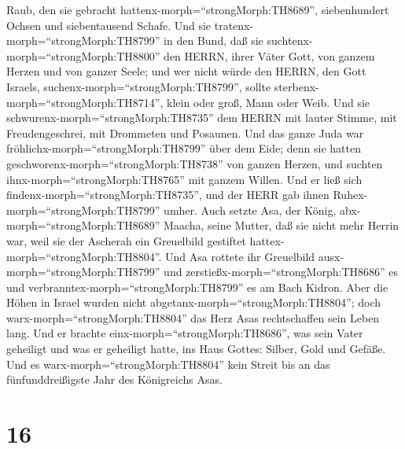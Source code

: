 Raub, den sie gebracht hattenx-morph=``strongMorph:TH8689'',
siebenhundert Ochsen und siebentausend Schafe.  Und sie
tratenx-morph=``strongMorph:TH8799'' in den Bund, daß sie
suchtenx-morph=``strongMorph:TH8800'' den HERRN, ihrer Väter Gott, von
ganzem Herzen und von ganzer Seele;  und wer nicht würde
den HERRN, den Gott Israels, suchenx-morph=``strongMorph:TH8799'',
sollte sterbenx-morph=``strongMorph:TH8714'', klein oder groß, Mann oder
Weib.  Und sie schwurenx-morph=``strongMorph:TH8735'' dem
HERRN mit lauter Stimme, mit Freudengeschrei, mit Drommeten und
Posaunen.  Und das ganze Juda war
fröhlichx-morph=``strongMorph:TH8799'' über dem Eide; denn sie hatten
geschworenx-morph=``strongMorph:TH8738'' von ganzen Herzen, und suchten
ihnx-morph=``strongMorph:TH8765'' mit ganzem Willen. Und er ließ sich
findenx-morph=``strongMorph:TH8735'', und der HERR gab ihnen
Ruhex-morph=``strongMorph:TH8799'' umher.  Auch setzte Asa,
der König, abx-morph=``strongMorph:TH8689'' Maacha, seine Mutter, daß
sie nicht mehr Herrin war, weil sie der Ascherah ein Greuelbild
gestiftet hattex-morph=``strongMorph:TH8804''. Und Asa rottete ihr
Greuelbild ausx-morph=``strongMorph:TH8799'' und
zerstießx-morph=``strongMorph:TH8686'' es und
verbranntex-morph=``strongMorph:TH8799'' es am Bach Kidron.
 Aber die Höhen in Israel wurden nicht
abgetanx-morph=``strongMorph:TH8804''; doch
warx-morph=``strongMorph:TH8804'' das Herz Asas rechtschaffen sein Leben
lang.  Und er brachte einx-morph=``strongMorph:TH8686'',
was sein Vater geheiligt und was er geheiligt hatte, ins Haus Gottes:
Silber, Gold und Gefäße.  Und es
warx-morph=``strongMorph:TH8804'' kein Streit bis an das
fünfunddreißigste Jahr des Königreichs Asas.

\hypertarget{section-15}{%
\section{16}\label{section-15}}

